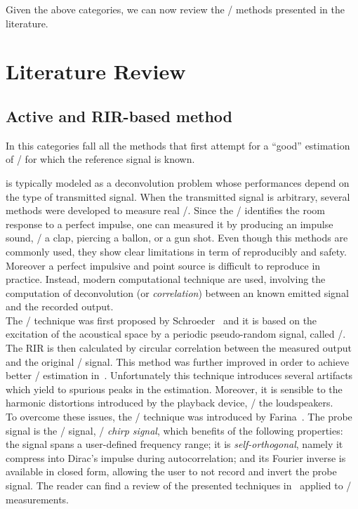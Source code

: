\mynewline
Given the above categories, we can now review the \AER/ methods presented in the literature.

\section{Literature Review}\label{sec:estimation:sota}

\subsection{Active and RIR-based method}\label{subsec:estimation:active_rir}
In this categories fall all the methods that first attempt for a ``good'' estimation of \RIRs/ for which the reference signal is known.

 is typically modeled as a deconvolution problem whose performances depend on the type of transmitted signal.
When the transmitted signal is arbitrary, several methods were developed to measure real \RIRs/.
Since the \RIR/ identifies the room response to a perfect impulse, one can measured it by producing an impulse sound, \eg/ a clap, piercing a ballon, or a gun shot.
Even though this methods are commonly used, they show clear limitations in term of reproducibly and safety.
Moreover a perfect impulsive and point source is difficult to reproduce in practice.
Instead, modern computational technique are used, involving the computation of deconvolution (or \textit{correlation}) between an known emitted signal and the recorded output.
\\The \MLSdef/ technique was first proposed by Schroeder~ and it is based on the excitation of the acoustical space by a periodic pseudo-random signal, called \MLS/.
The RIR is then calculated by circular correlation between the measured output and the original \MLS/ signal.
This method was further improved in order to achieve better \RIR/ estimation in~.
Unfortunately this technique introduces several artifacts which yield to spurious peaks in the estimation.
Moreover, it is sensible to the harmonic distortions introduced by the playback device, \eg/ the loudspeakers.
\\To overcome these issues, the \ESSdef/ technique was introduced by Farina~.
The probe signal is the \ESS/ signal, \aka/ \textit{chirp signal}, which benefits of the following properties:
the signal spans a user-defined frequency range; it is \textit{self-orthogonal}, namely it compress into Dirac's impulse during autocorrelation;
and its Fourier inverse is available in closed form, allowing the user to not record and invert the probe signal.
The reader can find a review of the presented techniques in~ applied to \RIR/ measurements.

